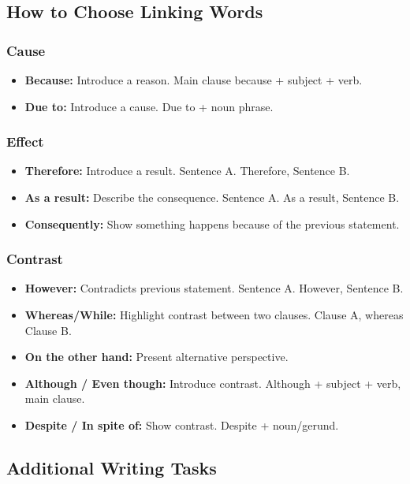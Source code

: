 \subsection{How to Choose Linking Words}

\subsubsection{Cause}
\begin{itemize}
    \item \textbf{Because:} Introduce a reason. Main clause because + subject + verb.
    \item \textbf{Due to:} Introduce a cause. Due to + noun phrase.
\end{itemize}

\subsubsection{Effect}
\begin{itemize}
    \item \textbf{Therefore:} Introduce a result. Sentence A. Therefore, Sentence B.
    \item \textbf{As a result:} Describe the consequence. Sentence A. As a result, Sentence B.
    \item \textbf{Consequently:} Show something happens because of the previous statement.
\end{itemize}

\subsubsection{Contrast}
\begin{itemize}
    \item \textbf{However:} Contradicts previous statement. Sentence A. However, Sentence B.
    \item \textbf{Whereas/While:} Highlight contrast between two clauses. Clause A, whereas Clause B.
    \item \textbf{On the other hand:} Present alternative perspective.
    \item \textbf{Although / Even though:} Introduce contrast. Although + subject + verb, main clause.
    \item \textbf{Despite / In spite of:} Show contrast. Despite + noun/gerund.
\end{itemize}

\subsection{Additional Writing Tasks}

